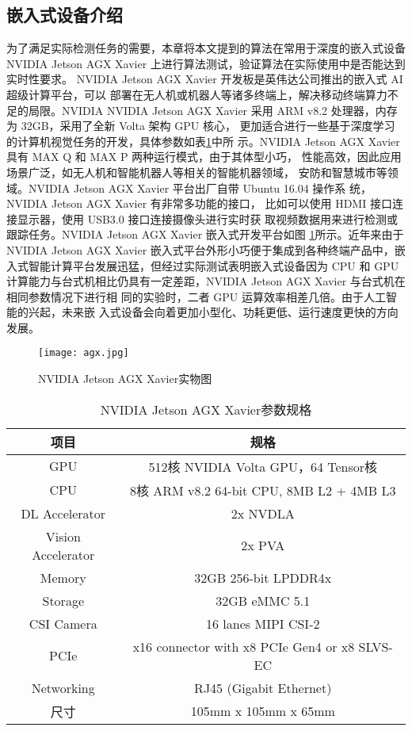 \subsection{嵌入式设备介绍}
为了满足实际检测任务的需要，本章将本文提到的算法在常用于深度的嵌入式设备 NVIDIA
Jetson AGX Xavier 上进行算法测试，验证算法在实际使用中是否能达到实时性要求。
NVIDIA Jetson AGX Xavier 开发板是英伟达公司推出的嵌入式 AI 超级计算平台，可以
部署在无人机或机器人等诸多终端上，解决移动终端算力不足的局限。NVIDIA
NVIDIA Jetson AGX Xavier 采用 ARM v8.2 处理器，内存为 32GB，采用了全新 Volta 架构 GPU 核心，
更加适合进行一些基于深度学习的计算机视觉任务的开发，具体参数如表\ref{t1}中所
示。NVIDIA Jetson AGX Xavier 具有 MAX Q 和 MAX P 两种运行模式，由于其体型小巧，
性能高效，因此应用场景广泛，如无人机和智能机器人等相关的智能机器领域，
安防和智慧城市等领域。NVIDIA Jetson AGX Xavier 平台出厂自带 Ubuntu 16.04 操作系
统，NVIDIA Jetson AGX Xavier 有非常多功能的接口，
比如可以使用 HDMI 接口连接显示器，使用 USB3.0 接口连接摄像头进行实时获
取视频数据用来进行检测或跟踪任务。NVIDIA Jetson AGX Xavier 嵌入式开发平台如图
\ref{agx}所示。近年来由于 NVIDIA Jetson AGX Xavier 嵌入式平台外形小巧便于集成到各种终端产品中，嵌
入式智能计算平台发展迅猛，但经过实际测试表明嵌入式设备因为 CPU 和 GPU
计算能力与台式机相比仍具有一定差距，NVIDIA Jetson AGX Xavier 与台式机在相同参数情况下进行相
同的实验时，二者 GPU 运算效率相差几倍。由于人工智能的兴起，未来嵌
入式设备会向着更加小型化、功耗更低、运行速度更快的方向发展。

\begin{figure}[htbp]
    \centering
    \texttt{[image: agx.jpg]}
    \caption{NVIDIA Jetson AGX Xavier实物图}
    \label{agx}
\end{figure}

\begin{table}[htbp]
    \caption{NVIDIA Jetson AGX Xavier参数规格}
    \vspace{0.5em}\centering\wuhao
    \begin{tabular}{cc}
    \toprule
    项目 & 规格\\
    \midrule
    GPU & 512核 NVIDIA Volta GPU，64 Tensor核\\
    CPU & 8核 ARM v8.2 64-bit CPU, 8MB L2 + 4MB L3\\
    DL Accelerator & 2x NVDLA\\
    Vision Accelerator & 2x PVA\\
    Memory & 32GB 256-bit LPDDR4x\\
    Storage & 32GB eMMC 5.1\\
    CSI Camera & 16 lanes MIPI CSI-2\\
    PCIe & x16 connector with x8 PCIe Gen4 or x8 SLVS-EC\\
    Networking & RJ45 (Gigabit Ethernet)\\
    尺寸 & 105mm x 105mm x 65mm\\
    \bottomrule
    \end{tabular}
    \label{t1}
\end{table}

